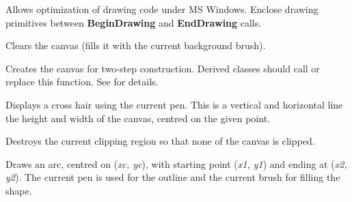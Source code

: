 

Allows optimization of drawing code under MS Windows. Enclose
drawing primitives between {\bf BeginDrawing} and {\bf EndDrawing}\rtfsp
calls.



Clears the canvas (fills it with the current background brush).



Creates the canvas for two-step construction. Derived classes
should call or replace this function. See \rtfsp
for details.

\label{wxcanvascrosshair}


Displays a cross hair using the current pen. This is a vertical
and horizontal line the height and width of the canvas, centred
on the given point.

\label{wxcanvasdestroyclippingregion}


Destroys the current clipping region so that none of the canvas is clipped.



Draws an arc, centred on ({\it xc, yc}), with starting point ({\it x1, y1})
and ending at ({\it x2, y2}).   The current pen is used for the outline
and the current brush for filling the shape.



